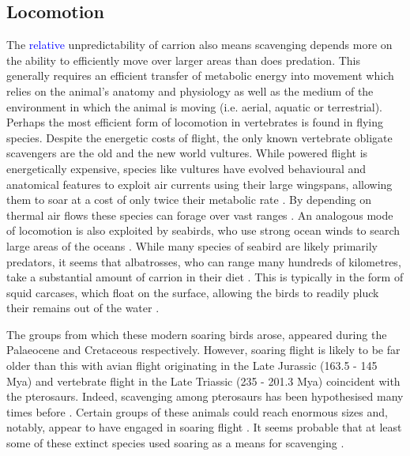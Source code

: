 \documentclass[a4paper,12pt]{article}
\begin{document}
\subsection{Locomotion}
The \textcolor{blue}{relative} unpredictability of carrion also means scavenging depends more on the ability to efficiently move over larger areas than does predation.
This generally requires an efficient transfer of metabolic energy into movement which relies on the animal's anatomy and physiology as well as the medium of the environment in which the animal is moving (i.e. aerial, aquatic or terrestrial).
Perhaps the most efficient form of locomotion in vertebrates is found in flying species. 
Despite the energetic costs of flight, the only known vertebrate obligate scavengers are the old and the new world vultures. 
While powered flight is energetically expensive, species like vultures have evolved behavioural and anatomical features to exploit air currents using their large wingspans, allowing them to soar at a cost of only twice their metabolic rate \citep{hedenstrom1993migration,spivey2014analysing}.
By depending on thermal air flows these species can forage over vast ranges \citep{spiegel2013factors}. 
An analogous mode of locomotion is also exploited by seabirds, who use strong ocean winds to search large areas of the oceans \citep{norberg2012vertebrate,thaxter2012seabird}. 
While many species of seabird are likely primarily predators, it seems that albatrosses, who can range many hundreds of kilometres, take a substantial amount of carrion in their diet \citep{croxall1994dead}. 
This is typically in the form of squid carcases, which float on the surface, allowing the birds to readily pluck their remains out of the water \citep{croxall1994dead}. 

The groups from which these modern soaring birds arose, appeared during the Palaeocene \citep[66 - 56 Million years ago (Mya); ][]{Jetz2012, Jarvis2014} and Cretaceous \citep[145.5 - 65.5 Mya; ][]{chiappe2006early} respectively. 
However, soaring flight is likely to be far older than this with avian flight originating in the Late Jurassic (163.5 - 145 Mya) and vertebrate flight in the Late Triassic (235 - 201.3 Mya) coincident with the pterosaurs. 
Indeed, scavenging among pterosaurs has been hypothesised many times before \citep{witton2008reappraisal}. 
Certain groups of these animals could reach enormous sizes \citep[e.g. Azhdarchids with wingspans of 11 metres; ][]{witton2010size} and, notably, appear to have engaged in soaring flight \citep{witton2010size}.
It seems probable that at least some of these extinct species used soaring as a means for scavenging \citep{witton2013pterosaurs}. 
\end{document}

